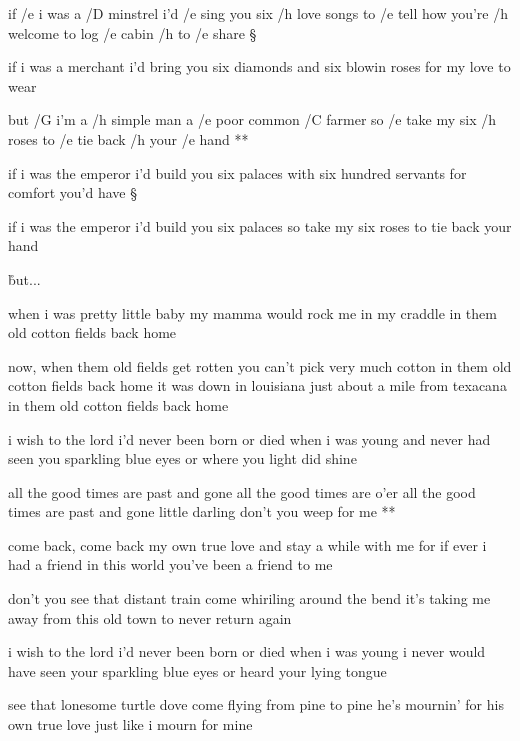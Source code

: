 



if /e i was a /D minstrel i'd /e sing you six /h love songs
to /e tell how you're /h welcome to log /e cabin /h to /e share \S

if i was a merchant i'd bring you six diamonds
and six blowin roses for my love to wear

\R but /G i'm a /h simple man a /e poor common /C farmer
   so /e take my six /h roses to /e tie back /h your /e hand **

if i was the emperor i'd build you six palaces
with six hundred servants for comfort you'd have \S

if i was the emperor i'd build you six palaces
so take my six roses to tie back your hand

\r but...




when i was pretty little baby
my mamma would rock me in my craddle
in them old cotton fields back home \s

now, when them old fields get rotten
you can't pick very much cotton
in them old cotton fields back home
it was down in louisiana
just about a mile from texacana
in them old cotton fields back home




i wish to the lord i'd never been born
or died when i was young
and never had seen you sparkling blue eyes
or where you light did shine

\R all the good times are past and gone
   all the good times are o'er
   all the good times are past and gone
   little darling don't you weep for me **

come back, come back my own true love
and stay a while with me
for if ever i had a friend in this world
you've been a friend to me \s

don't you see that distant train
come whiriling around the bend
it's taking me away from this old town
to never return again \s

i wish to the lord i'd never been born
or died when i was young
i never would have seen your sparkling blue eyes
or heard your lying tongue \s

see that lonesome turtle dove
come flying from pine to pine
he's mournin'  for his own true love
just like i mourn for mine \s

